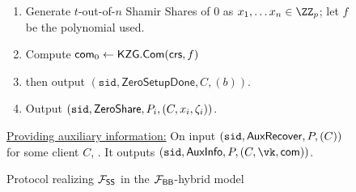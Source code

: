 \begin{figure*}
\begin{mdframed}
\begin{enumerate}
        \item Generate $t$-out-of-$n$ Shamir Shares of $0$ as $x_1, \ldots x_n \in \ZZ_p$; let $f$ be the polynomial used.
        \item Compute $\mathsf{com}_0 \gets \mathsf{KZG}.\mathsf{Com}(\mathsf{crs}, f)$
        \item {} then output $(\texttt{sid}, \mathsf{ZeroSetupDone}, C, (b))$. 
        \item {}
        Output $(\texttt{sid},\mathsf{ZeroShare}, P_i,\allowbreak (C, x_i, \zeta_i))$. %
    \end{enumerate}
\underline{Providing auxiliary information:}
On input $(\texttt{sid}, \mathsf{AuxRecover}, P, (C))$ for some client $C$, .
It outputs $(\sid, \mathsf{AuxInfo}, P, (C, \vk, \com))$.%
    \end{mdframed}
    \caption{Protocol realizing $\mathcal{F}_\mathsf{SS}$ in the $\mathcal{F}_\mathsf{BB}$-hybrid model}
    \label{fig:fs_protocol}
\end{figure*}